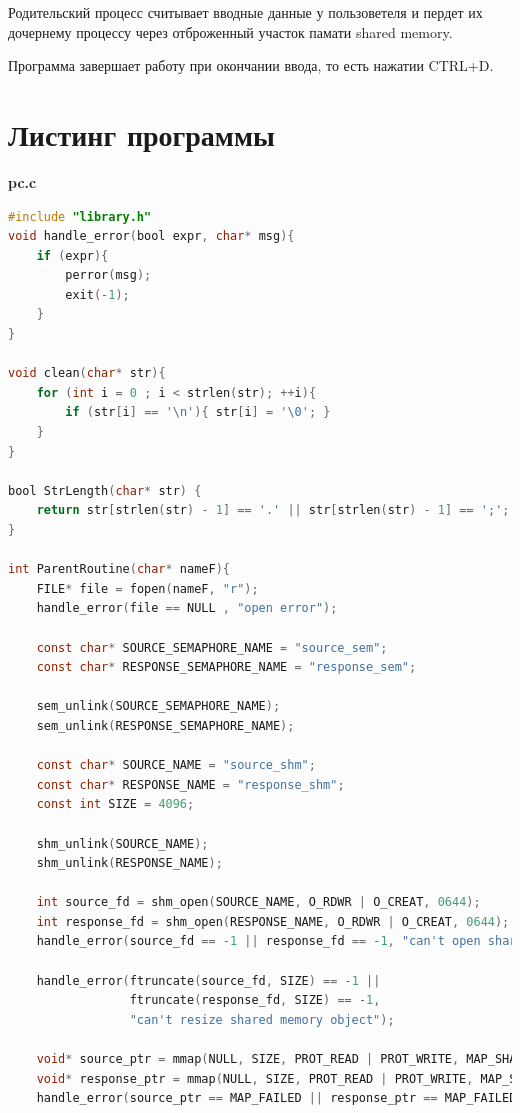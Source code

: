\documentclass[pdf, unicode, 12pt, a4paper,oneside,fleqn]{article}
\begin{document}
Родительский процесс считывает вводные данные у пользоветеля и пердет их дочернему процессу через отброженный участок памати shared memory.

Программа завершает работу при окончании ввода, то есть нажатии CTRL+D.

\section{Листинг программы}

{\large\textbf{pc.c}}

\begin{lstlisting}[language=C]
#include "library.h"
void handle_error(bool expr, char* msg){
    if (expr){
        perror(msg);
        exit(-1);
    }
}

void clean(char* str){
    for (int i = 0 ; i < strlen(str); ++i){
        if (str[i] == '\n'){ str[i] = '\0'; }
    }
}

bool StrLength(char* str) {
    return str[strlen(str) - 1] == '.' || str[strlen(str) - 1] == ';';
}

int ParentRoutine(char* nameF){
    FILE* file = fopen(nameF, "r");
    handle_error(file == NULL , "open error");

    const char* SOURCE_SEMAPHORE_NAME = "source_sem";
    const char* RESPONSE_SEMAPHORE_NAME = "response_sem";

    sem_unlink(SOURCE_SEMAPHORE_NAME);
    sem_unlink(RESPONSE_SEMAPHORE_NAME);

    const char* SOURCE_NAME = "source_shm";
    const char* RESPONSE_NAME = "response_shm";
    const int SIZE = 4096;

    shm_unlink(SOURCE_NAME);
    shm_unlink(RESPONSE_NAME);

    int source_fd = shm_open(SOURCE_NAME, O_RDWR | O_CREAT, 0644);
    int response_fd = shm_open(RESPONSE_NAME, O_RDWR | O_CREAT, 0644);
    handle_error(source_fd == -1 || response_fd == -1, "can't open shared memory object");

    handle_error(ftruncate(source_fd, SIZE) == -1 ||
                 ftruncate(response_fd, SIZE) == -1,
                 "can't resize shared memory object");

    void* source_ptr = mmap(NULL, SIZE, PROT_READ | PROT_WRITE, MAP_SHARED, source_fd, 0);
    void* response_ptr = mmap(NULL, SIZE, PROT_READ | PROT_WRITE, MAP_SHARED, response_fd, 0);
    handle_error(source_ptr == MAP_FAILED || response_ptr == MAP_FAILED, "can't mmap shared memory object");


\end{lstlisting}
\end{document}
